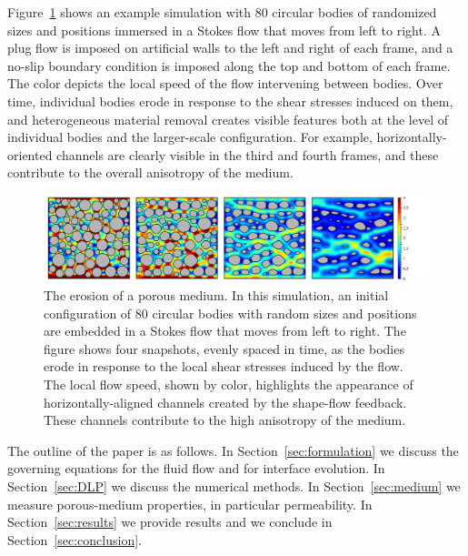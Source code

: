 \documentclass[3p]{elsarticle}
\begin{document}
Figure~\ref{fig1} shows an example simulation with 80 circular bodies of randomized sizes and positions immersed in a Stokes flow that moves from left to right. A plug flow is imposed on artificial walls to the left and right of each frame, and a no-slip boundary condition is imposed along the top and bottom of each frame. The color depicts the local speed of the flow intervening between bodies. Over time, individual bodies erode in response to the shear stresses induced on them, and heterogeneous material removal creates visible features both at the level of individual bodies and the larger-scale configuration. For example, horizontally-oriented channels are clearly visible in the third and fourth frames, and these contribute to the overall anisotropy of the medium.



\begin{figure}%
\centering
\includegraphics[width = 0.99 \textwidth]{./figs/Velocity-80-4.pdf}
\caption{The erosion of a porous medium. In this simulation, an initial configuration of 80 circular bodies with random sizes and positions are embedded in a Stokes flow that moves from left to right. The figure shows four snapshots, evenly spaced in time, as the bodies erode in response to the local shear stresses induced by the flow. The local flow speed, shown by color, highlights the appearance of horizontally-aligned channels created by the shape-flow feedback. These channels contribute to the high anisotropy of the medium.
\label{fig1}
}
\end{figure}

The outline of the paper is as follows. In Section~\ref{sec:formulation} we discuss the governing equations for the fluid flow and for interface evolution. In Section~\ref{sec:DLP} we discuss the numerical methods. In Section~\ref{sec:medium} we measure porous-medium properties, in particular permeability. In Section~\ref{sec:results} we provide results and we conclude in Section~\ref{sec:conclusion}.
\end{document}
